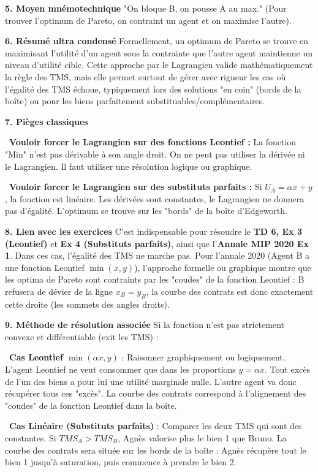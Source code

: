 \documentclass[11pt, a4paper]{report}
\begin{document}
\textbf{5. Moyen mnémotechnique}
"On bloque B, on pousse A au max." (Pour trouver l'optimum de Pareto, on contraint un agent et on maximise l'autre).

\textbf{6. Résumé ultra condensé}
Formellement, un optimum de Pareto se trouve en maximisant l'utilité d'un agent sous la contrainte que l'autre agent maintienne un niveau d'utilité cible. Cette approche par le Lagrangien valide mathématiquement la règle des TMS, mais elle permet surtout de gérer avec rigueur les cas où l'égalité des TMS échoue, typiquement lors des solutions "en coin" (bords de la boîte) ou pour les biens parfaitement substituables/complémentaires.

\textbf{7. Pièges classiques}
\par \textbullet\ \textbf{Vouloir forcer le Lagrangien sur des fonctions Leontief :} La fonction "Min" n'est pas dérivable à son angle droit. On ne peut pas utiliser la dérivée ni le Lagrangien. Il faut utiliser une résolution logique ou graphique.
\par \textbullet\ \textbf{Vouloir forcer le Lagrangien sur des substituts parfaits :} Si $U_A = \alpha x + y$, la fonction est linéaire. Les dérivées sont constantes, le Lagrangien ne donnera pas d'égalité. L'optimum se trouve sur les "bords" de la boîte d'Edgeworth.

\textbf{8. Lien avec les exercices}
C'est indispensable pour résoudre le \textbf{TD 6, Ex 3 (Leontief)} et \textbf{Ex 4 (Substituts parfaits)}, ainsi que l'\textbf{Annale MIP 2020 Ex 1}. Dans ces cas, l'égalité des TMS ne marche pas. 
Pour l'annale 2020 (Agent B a une fonction Leontief $\min(x,y)$), l'approche formelle ou graphique montre que les optima de Pareto sont contraints par les "coudes" de la fonction Leontief : B refusera de dévier de la ligne $x_B = y_B$, la courbe des contrats est donc exactement cette droite (les sommets des angles droits).

\textbf{9. Méthode de résolution associée}
Si la fonction n'est pas strictement convexe et différentiable (exit les TMS) :
\par \textbullet\ \textbf{Cas Leontief $\min(\alpha x, y)$} : Raisonner graphiquement ou logiquement. L'agent Leontief ne veut consommer que dans les proportions $y = \alpha x$. Tout excès de l'un des biens a pour lui une utilité marginale nulle. L'autre agent va donc récupérer tous ces "excès". La courbe des contrats correspond à l'alignement des "coudes" de la fonction Leontief dans la boîte.
\par \textbullet\ \textbf{Cas Linéaire (Substituts parfaits)} : Comparer les deux TMS qui sont des constantes. Si $TMS_A > TMS_B$, Agnès valorise plus le bien 1 que Bruno. La courbe des contrats sera située sur les bords de la boîte : Agnès récupère tout le bien 1 jusqu'à saturation, puis commence à prendre le bien 2.
\end{document}
